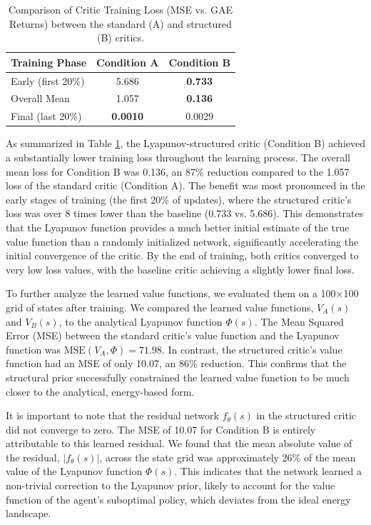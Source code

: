 \documentclass[]{article}
\begin{document}
\begin{table}[h!]
\centering
\caption{Comparison of Critic Training Loss (MSE vs. GAE Returns) between the standard (A) and structured (B) critics.}
\label{tab:critic_loss}
\begin{tabular}{lcc}
\hline
\hline
Training Phase & Condition A & Condition B \\
\hline
Early (first 20\%) & 5.686 & \textbf{0.733} \\
Overall Mean & 1.057 & \textbf{0.136} \\
Final (last 20\%) & \textbf{0.0010} & 0.0029 \\
\hline
\end{tabular}
\end{table}

As summarized in Table \ref{tab:critic_loss}, the Lyapunov-structured critic (Condition B) achieved a substantially lower training loss throughout the learning process. The overall mean loss for Condition B was 0.136, an 87\% reduction compared to the 1.057 loss of the standard critic (Condition A). The benefit was most pronounced in the early stages of training (the first 20\% of updates), where the structured critic's loss was over 8 times lower than the baseline (0.733 vs. 5.686). This demonstrates that the Lyapunov function provides a much better initial estimate of the true value function than a randomly initialized network, significantly accelerating the initial convergence of the critic. By the end of training, both critics converged to very low loss values, with the baseline critic achieving a slightly lower final loss.

To further analyze the learned value functions, we evaluated them on a 100$\times$100 grid of states after training. We compared the learned value functions, $V_A(s)$ and $V_B(s)$, to the analytical Lyapunov function $\Phi(s)$. The Mean Squared Error (MSE) between the standard critic's value function and the Lyapunov function was $\text{MSE}(V_A, \Phi) = 71.98$. In contrast, the structured critic's value function had an MSE of only 10.07, an 86\% reduction. This confirms that the structural prior successfully constrained the learned value function to be much closer to the analytical, energy-based form.

It is important to note that the residual network $f_\theta(s)$ in the structured critic did not converge to zero. The MSE of 10.07 for Condition B is entirely attributable to this learned residual. We found that the mean absolute value of the residual, $|f_\theta(s)|$, across the state grid was approximately 26\% of the mean value of the Lyapunov function $\Phi(s)$. This indicates that the network learned a non-trivial correction to the Lyapunov prior, likely to account for the value function of the agent's suboptimal policy, which deviates from the ideal energy landscape.
\end{document}
